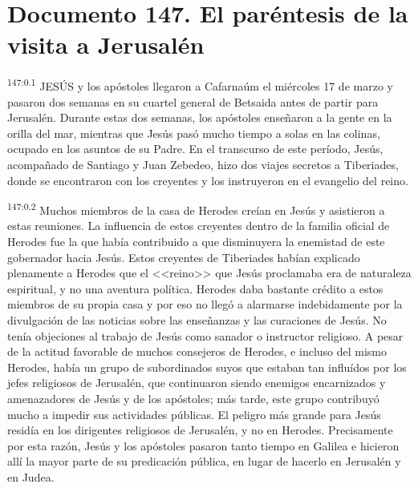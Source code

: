 \chapter{Documento 147. El paréntesis de la visita a Jerusalén}
\par 
\textsuperscript{147:0.1} JESÚS y los apóstoles llegaron a Cafarnaúm el miércoles 17 de marzo y pasaron dos semanas en su cuartel general de Betsaida antes de partir para Jerusalén. Durante estas dos semanas, los apóstoles enseñaron a la gente en la orilla del mar, mientras que Jesús pasó mucho tiempo a solas en las colinas, ocupado en los asuntos de su Padre. En el transcurso de este período, Jesús, acompañado de Santiago y Juan Zebedeo, hizo dos viajes secretos a Tiberiades, donde se encontraron con los creyentes y los instruyeron en el evangelio del reino.

\par 
\textsuperscript{147:0.2} Muchos miembros de la casa de Herodes creían en Jesús y asistieron a estas reuniones. La influencia de estos creyentes dentro de la familia oficial de Herodes fue la que había contribuido a que disminuyera la enemistad de este gobernador hacia Jesús. Estos creyentes de Tiberiades habían explicado plenamente a Herodes que el <<reino>> que Jesús proclamaba era de naturaleza espiritual, y no una aventura política. Herodes daba bastante crédito a estos miembros de su propia casa y por eso no llegó a alarmarse indebidamente por la divulgación de las noticias sobre las enseñanzas y las curaciones de Jesús. No tenía objeciones al trabajo de Jesús como sanador o instructor religioso. A pesar de la actitud favorable de muchos consejeros de Herodes, e incluso del mismo Herodes, había un grupo de subordinados suyos que estaban tan influídos por los jefes religiosos de Jerusalén, que continuaron siendo enemigos encarnizados y amenazadores de Jesús y de los apóstoles; más tarde, este grupo contribuyó mucho a impedir sus actividades públicas. El peligro más grande para Jesús residía en los dirigentes religiosos de Jerusalén, y no en Herodes. Precisamente por esta razón, Jesús y los apóstoles pasaron tanto tiempo en Galilea e hicieron allí la mayor parte de su predicación pública, en lugar de hacerlo en Jerusalén y en Judea.

